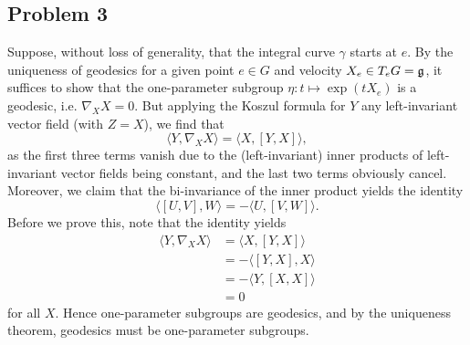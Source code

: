 \documentclass{../mathnotes}
\begin{document}
\subsection*{Problem 3}

Suppose, without loss of generality, that the integral curve $\gamma$ starts at $e$.
By the uniqueness of geodesics for a given point $e\in G$ and velocity $X_e\in T_eG=\mathfrak g$,
it suffices to show that the one-parameter subgroup $\eta:t\mapsto \exp(tX_e)$ is a geodesic,
i.e. $\nabla_XX=0$. But applying the Koszul formula for $Y$ any left-invariant vector field
(with $Z=X$), we find that 
\[\langle Y,\nabla_XX\rangle = \langle X,[Y,X]\rangle,\]
as the first three terms vanish due to the (left-invariant) inner products of left-invariant vector fields being
constant, and the last two terms obviously cancel. Moreover, we claim that the bi-invariance of the inner
product yields the identity
\[\langle [U,V],W\rangle = -\langle U,[V,W]\rangle.\]
Before we prove this, note that the identity yields
\begin{align*}
    \langle Y,\nabla_XX\rangle &= \langle X,[Y,X]\rangle \\
    &= -\langle [Y,X],X\rangle\\
    &=-\langle Y,[X,X]\rangle\\
    &=0
\end{align*}
for all $X$. Hence one-parameter subgroups are geodesics, and by the uniqueness
theorem, geodesics must be one-parameter subgroups.
\end{document}
